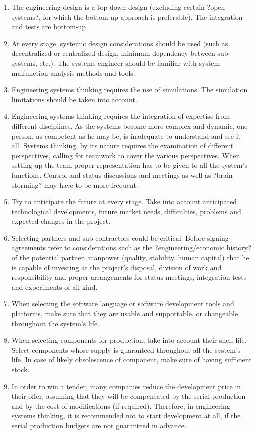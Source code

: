 \documentclass[11pt]{article}
\begin{document}
\begin{enumerate}
\item The engineering design is a top-down design (excluding certain ?open systems?, for which the bottom-up approach is preferable). The integration and tests are bottom-up.
\item At every stage, systemic design considerations should be used (such as decentralized or centralized design, minimum dependency between sub-systems, etc.). The systems engineer should be familiar with system malfunction analysis methods and tools.
\item Engineering systems thinking requires the use of simulations. The simulation limitations should be taken into account.
\item Engineering systems thinking requires the integration of expertise from different disciplines. As the systems become more complex and dynamic, one person, as competent as he may be, is inadequate to understand and see it all. Systems thinking, by its nature requires the examination of different perspectives, calling for teamwork to cover the various perspectives. When setting up the team proper representation has to be given to all the system's functions. Control and status discussions and meetings as well as ?brain storming? may have to be more frequent.
\item Try to anticipate the future at every stage. Take into account anticipated technological developments, future market needs, difficulties, problems and expected changes in the project.
\item Selecting partners and sub-contractors could be critical. Before signing agreements refer to considerations such as the ?engineering/economic history? of the potential partner, manpower (quality, stability, human capital) that he is capable of investing at the project's disposal, division of work and responsibility and proper arrangements for status meetings, integration tests and experiments of all kind.
\item When selecting the software language or software development tools and platforms, make sure that they are usable and supportable, or changeable, throughout the system's life.
\item When selecting components for production, take into account their shelf life. Select components whose supply is guaranteed throughout all the system's life. In case of likely obsolescence of component, make sure of having sufficient stock.
\item In order to win a tender, many companies reduce the development price in their offer, assuming that they will be compensated by the serial production and by the cost of modifications (if required). Therefore, in engineering systems thinking, it is recommended not to start development at all, if the serial production budgets are not guaranteed in advance.

\end{enumerate}
\end{document}
